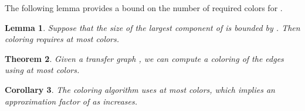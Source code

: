 \documentclass[titlepage, 11pt]{article}
\newtheorem{theorem}{Theorem}
\newtheorem{lemma}[theorem]{Lemma}
\newtheorem{corollary}[theorem]{Corollary}
\begin{document}
The following lemma provides a bound on the number of required colors for .
\begin{lemma} \label{lemma:G0}
Suppose that the size of the largest component of  is bounded by . 
Then coloring  requires at most  colors.
\end{lemma}

\begin{theorem}
Given a transfer graph , we can compute a coloring of the edges using at most 
colors.
\end{theorem}

\begin{corollary}
The coloring algorithm uses at most  colors, which implies an approximation factor of  as   increases.
\end{corollary}






 
\end{document}
